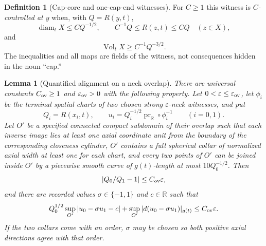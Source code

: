 \documentclass[10pt]{coll-l}
\newcommand{\R}{\mathbb{R}}
\newtheorem{lemma}[theorem]{Lemma}
\theoremstyle{definition}
\newtheorem{definition}[theorem]{Definition}
\theoremstyle{remark}
\numberwithin{section}{chapter}
\numberwithin{equation}{chapter}
\newcommand{\Vol}{\operatorname{Vol}}
\begin{document}
\begin{definition}[Cap-core and one-cap-end witnesses]
For $C\geq1$ this witness is \emph{$C$-controlled at $y$} when, with
$Q=R(y,t)$,
\begin{equation}
 \operatorname{diam}_tX\leq C Q^{-1/2},\qquad
 C^{-1}Q\leq R(z,t)\leq CQ\quad(z\in X),               \label{eq:ncs-controlled-cap}
\end{equation}
and
\begin{equation}
                  \Vol_tX\geq C^{-1}Q^{-3/2}.          \label{eq:ncs-controlled-cap-volume}
\end{equation}
The inequalities and all maps are fields of the witness, not consequences
hidden in the noun ``cap.''
\end{definition}

\begin{lemma}[Quantified alignment on a neck overlap]
\label{lem:ncs-neck-overlap-alignment}
There are universal constants $C_{\rm ov}\geq1$ and
$\varepsilon_{\rm ov}>0$ with the following property.  Let
$0<\varepsilon\leq\varepsilon_{\rm ov}$, let $\phi_i$ be the terminal
spatial charts of two chosen strong $\varepsilon$-neck witnesses, and put
\begin{equation}
 Q_i=R(x_i,t),\qquad
 u_i=Q_i^{-1/2}\operatorname{pr}_{\R}\circ\phi_i^{-1}\qquad(i=0,1).
                                                               \label{eq:ncs-physical-axial-functions}
\end{equation}
Let $O'$ be a specified connected compact subdomain of their overlap such
that each inverse image lies at least one axial coordinate unit from the
boundary of the corresponding closeness cylinder, $O'$ contains a full
spherical collar of normalized axial width at least one for each chart,
and every two points of $O'$ can be joined inside $O'$ by a piecewise
smooth curve of $g(t)$-length at most $10Q_0^{-1/2}$.  Then
\begin{equation}
 \left|Q_0/Q_1-1\right|\leq C_{\rm ov}\varepsilon,     \label{eq:ncs-overlap-scale-ratio}
\end{equation}
and there are recorded values $\sigma\in\{-1,1\}$ and $c\in\R$ such that
\begin{equation}
 Q_0^{1/2}\sup_{O'}|u_0-\sigma u_1-c|
 +\sup_{O'}|d(u_0-\sigma u_1)|_{g(t)}
       \leq C_{\rm ov}\varepsilon.                    \label{eq:ncs-overlap-C1-bound}
\end{equation}
If the two collars come with an order, $\sigma$ may be chosen so both
positive axial directions agree with that order.
\end{lemma}
\end{document}
